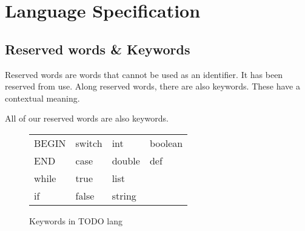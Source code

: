 \chapter{Language Specification}\label{ch:langspec}

\section{Reserved words \& Keywords}
Reserved words are words that cannot be used as an identifier. It has been reserved from use.
Along reserved words, there are also keywords. These have a contextual meaning.

All of our reserved words are also keywords.

\begin{figure}[h]
\begin{tabular}{llll}
BEGIN & switch & int    & boolean \\
END   & case   & double & def     \\
while & true   & list   &         \\
if    & false  & string &        
\end{tabular}
\caption{Keywords in TODO lang}
\label{fig:keywords}
\end{figure}